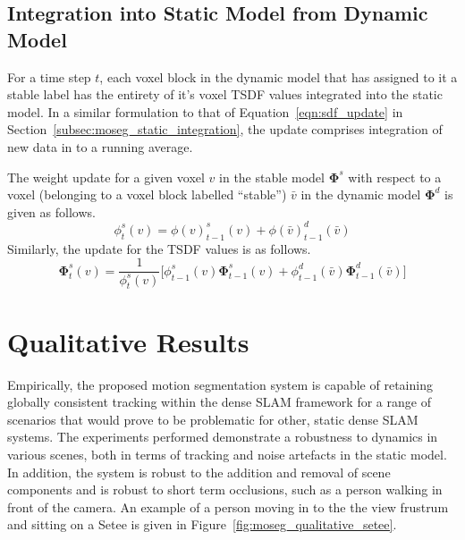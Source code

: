 \subsection{Integration into Static Model from Dynamic Model}
\label{sub:moseg_static_to_dynamic}
For a time step \(t\), each voxel block in the dynamic model that has assigned to
it a stable label has the entirety of it's voxel TSDF values integrated into the
static model. In a similar formulation to that of Equation~\ref{eqn:sdf_update}
in Section~\ref{subsec:moseg_static_integration}, the update comprises 
integration of new data in to a running average.

The weight update for a given voxel \(v\) in the stable model \(\bm{\Phi}^{s}\)
with respect to a voxel (belonging to a voxel block labelled ``stable'') 
\(\bar{v}\) in the dynamic model \(\bm{\Phi}^{d}\) is given as follows.
\begin{equation}
  \label{eqn:moseg_weight_update}
  \phi^{s}_{t}(v) = \phi(v)^{s}_{t-1}(v) + \phi(\bar{v})^{d}_{t-1}(\bar{v})
\end{equation}
Similarly, the update for the TSDF values is as follows.
\begin{equation}
  \label{eqn:moseg_sdf_update}
  \bm{\Phi}^{s}_{t}(v) = \frac{1}{\phi^{s}_{t}(v)} \bigg[
  \phi^{s}_{t-1}(v) \bm{\Phi}^{s}_{t-1}(v) +
  \phi^{d}_{t-1}(\bar{v}) \bm{\Phi}^{d}_{t-1}(\bar{v})
  \bigg]
\end{equation}

\section{Qualitative Results}
\label{sec:moseg_qualitative}
Empirically, the proposed motion segmentation system is capable of retaining
globally consistent tracking within the dense SLAM framework for a range of
scenarios that would prove to be problematic for other, static dense SLAM
systems. The experiments performed demonstrate a robustness	to dynamics in
various scenes, both in terms of tracking and noise artefacts in the static
model. In addition, the system is robust to the addition and removal of scene
components and is robust to short term occlusions, such as a person walking in
front of the camera. An example of a person moving in to the the view frustrum
and sitting on a Setee is given in Figure~\ref{fig:moseg_qualitative_setee}.


